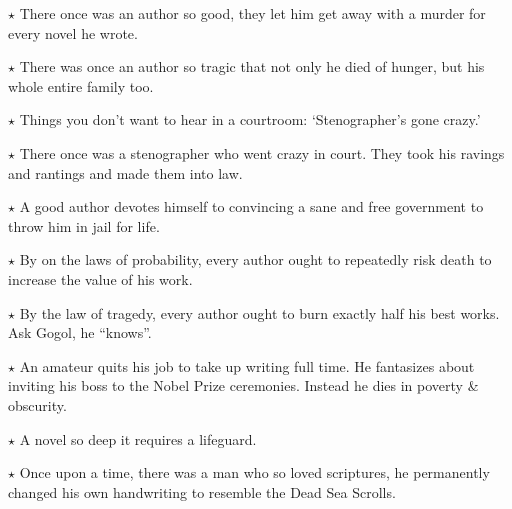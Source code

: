 \documentclass[oneside]{book}
\begin{document}

$\star$ There once was an author so good, they let him get away with
a murder for every novel he wrote.

$\star$ There was once an author so tragic that not only he died of hunger,
but his whole entire family too.


$\star$ Things you don't want to hear in a courtroom: `Stenographer's gone crazy.'

$\star$ There once was a stenographer who went crazy in court.  They took his
ravings and rantings and made them into law.



$\star$ A good author
devotes himself to convincing a sane
and free government to throw him in jail for life.

$\star$ By on the laws of probability, every author ought to repeatedly risk
death to increase the value of his work.


$\star$ By the law of tragedy, every author ought to burn exactly half
his best works.  Ask Gogol, he ``knows''.


$\star$ An amateur quits his job to take up writing full time.
He fantasizes about inviting his boss to the Nobel Prize ceremonies.
Instead he dies in poverty \& obscurity.

$\star$ A novel so deep it requires a lifeguard.

$\star$ Once upon a time, there was a man who so loved scriptures,
he permanently changed his own handwriting to resemble the Dead Sea Scrolls.
\end{document}
